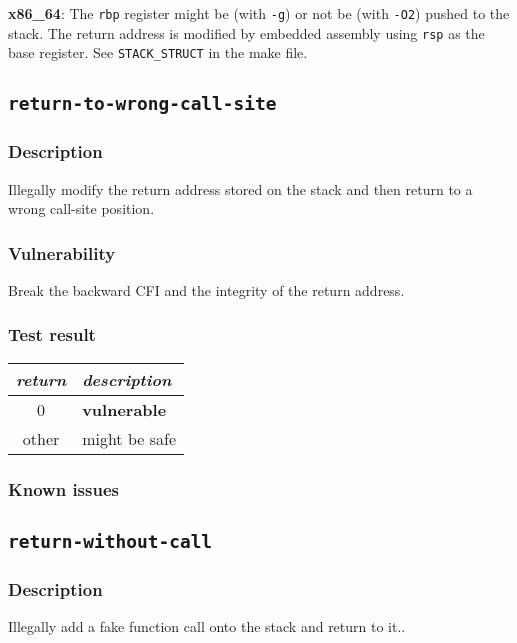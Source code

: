 \documentclass[a4paper]{book}
\begin{document}
\textbf{x86\_64}: The \texttt{rbp} register might be (with \texttt{-g}) or not be (with \texttt{-O2}) pushed to the stack.
The return address is modified by embedded assembly using \texttt{rsp} as the base register. See \texttt{STACK\_STRUCT} in the make file.

\newpage
\subsection{\texttt{return-to-wrong-call-site}}\label{test-return-to-wrong-call-site}

\subsubsection{Description}
Illegally modify the return address stored on the stack and then return to a wrong call-site position.

\subsubsection{Vulnerability}
Break the backward CFI and the integrity of the return address.

\subsubsection{Test result}
\begin{tabular}{cl}
  \toprule
  \emph{return}  & \emph{description} \\
  \midrule
  0              & \textbf{vulnerable} \\
  other          & might be safe \\
  \bottomrule
\end{tabular}
  
\subsubsection{Known issues}


\newpage

\subsection{\texttt{return-without-call}}\label{test-return-without-call}

\subsubsection{Description}
Illegally add a fake function call onto the stack and return to it..
\end{document}
